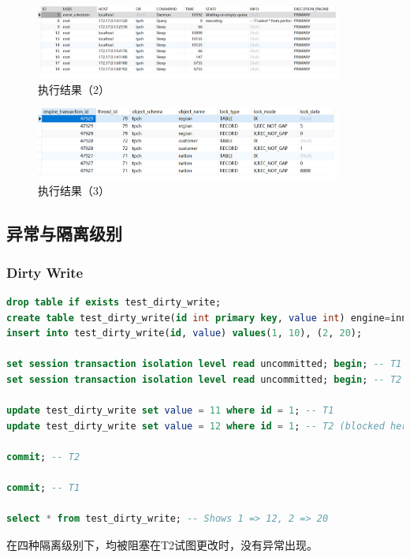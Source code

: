 \documentclass{article}
\begin{document}
\begin{figure}[H]
  \centering
  \includegraphics[width=0.9\textwidth]{img/46.png}
  \caption{执行结果（2）}
\end{figure}

\begin{figure}[H]
  \centering
  \includegraphics[width=0.9\textwidth]{img/47.png}
  \caption{执行结果（3）}
\end{figure}

\subsection{异常与隔离级别}

\subsubsection{Dirty Write}

\begin{lstlisting}[language=sql]
drop table if exists test_dirty_write;
create table test_dirty_write(id int primary key, value int) engine=innodb;
insert into test_dirty_write(id, value) values(1, 10), (2, 20);

set session transaction isolation level read uncommitted; begin; -- T1
set session transaction isolation level read uncommitted; begin; -- T2

update test_dirty_write set value = 11 where id = 1; -- T1
update test_dirty_write set value = 12 where id = 1; -- T2 (blocked here)

commit; -- T2 

commit; -- T1

select * from test_dirty_write; -- Shows 1 => 12, 2 => 20
\end{lstlisting}

在四种隔离级别下，均被阻塞在T2试图更改时，没有异常出现。
\end{document}
